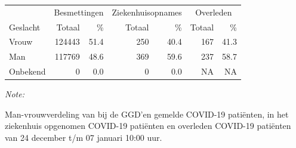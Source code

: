 \documentclass[
  english,
  man,floatsintext]{apa6}
\begin{document}
\begin{table}
\centering\begingroup\fontsize{11}{13}\selectfont

\begin{threeparttable}
\begin{tabular}{lrrrrrr}
\toprule
\multicolumn{1}{c}{ } & \multicolumn{2}{c}{Besmettingen} & \multicolumn{2}{c}{Ziekenhuisopnames} & \multicolumn{2}{c}{Overleden} \\
\cmidrule(l{3pt}r{3pt}){2-3} \cmidrule(l{3pt}r{3pt}){4-5} \cmidrule(l{3pt}r{3pt}){6-7}
Geslacht & Totaal & \% & Totaal & \% & Totaal & \%\\
\midrule
Vrouw & 124443 & 51.4 & 250 & 40.4 & 167 & 41.3\\
Man & 117769 & 48.6 & 369 & 59.6 & 237 & 58.7\\
Onbekend & 0 & 0.0 & 0 & 0.0 & NA & NA\\
\bottomrule
\end{tabular}
\begin{tablenotes}
\item \textit{Note: } 
\item Man-vrouwverdeling van bij de GGD’en gemelde COVID-19 patiënten, in het ziekenhuis opgenomen COVID-19 patiënten en overleden COVID-19 patiënten van 24 december t/m 07 januari 10:00 uur.
\end{tablenotes}
\end{threeparttable}
\endgroup{}
\end{table}
\newpage
\end{document}
